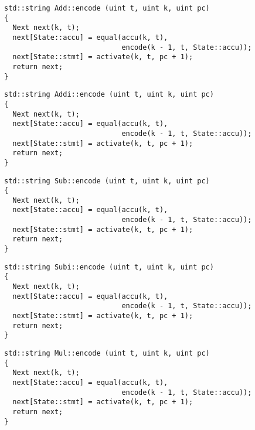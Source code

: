 
\begin{lstlisting}[style=c++, style=encode]
std::string Add::encode (uint t, uint k, uint pc)
{
  Next next(k, t);
  next[State::accu] = equal(accu(k, t),
                            encode(k - 1, t, State::accu));
  next[State::stmt] = activate(k, t, pc + 1);
  return next;
}
\end{lstlisting}


\newpage

\begin{lstlisting}[style=c++, style=encode]
std::string Addi::encode (uint t, uint k, uint pc)
{
  Next next(k, t);
  next[State::accu] = equal(accu(k, t),
                            encode(k - 1, t, State::accu));
  next[State::stmt] = activate(k, t, pc + 1);
  return next;
}
\end{lstlisting}


\begin{lstlisting}[style=c++, style=encode]
std::string Sub::encode (uint t, uint k, uint pc)
{
  Next next(k, t);
  next[State::accu] = equal(accu(k, t),
                            encode(k - 1, t, State::accu));
  next[State::stmt] = activate(k, t, pc + 1);
  return next;
}
\end{lstlisting}


\begin{lstlisting}[style=c++, style=encode]
std::string Subi::encode (uint t, uint k, uint pc)
{
  Next next(k, t);
  next[State::accu] = equal(accu(k, t),
                            encode(k - 1, t, State::accu));
  next[State::stmt] = activate(k, t, pc + 1);
  return next;
}
\end{lstlisting}


\begin{lstlisting}[style=c++, style=encode]
std::string Mul::encode (uint t, uint k, uint pc)
{
  Next next(k, t);
  next[State::accu] = equal(accu(k, t),
                            encode(k - 1, t, State::accu));
  next[State::stmt] = activate(k, t, pc + 1);
  return next;
}
\end{lstlisting}

